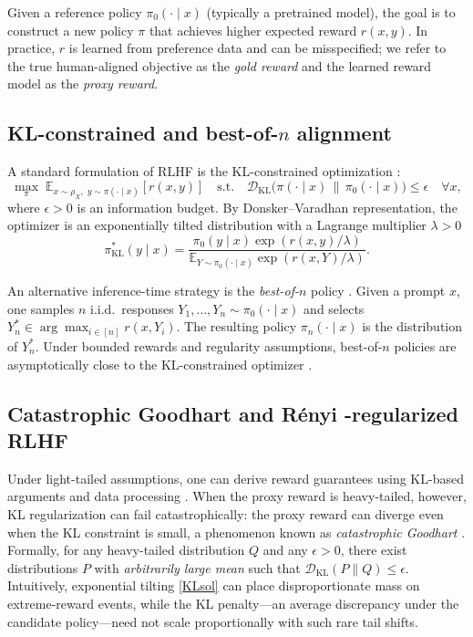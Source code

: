 \documentclass[11pt]{article}
\providecommand{\DD}{\mathcal{D}}
\providecommand{\Renyi}{R\'enyi }
\begin{document}
Given a reference policy $\pi_0(\cdot\mid x)$ (typically a pretrained model),
the goal is to construct a new policy $\pi$ that achieves higher expected reward
$r(x,y)$.  In practice, $r$ is learned from preference data and can be
misspecified; we refer to the true human-aligned objective as the \emph{gold
reward} and the learned reward model as the \emph{proxy reward}.

\subsection{KL-constrained and best-of-\texorpdfstring{$n$}{n} alignment}

A standard formulation of RLHF is the KL-constrained optimization
\citep{ouyang2022training}:
\begin{equation}\label{opt}
\max_{\pi}\;
\mathbb{E}_{x\sim\rho_X,\;y\sim\pi(\cdot\mid x)}[r(x,y)]
\quad\text{s.t.}\quad
\DD_{\mathrm{KL}}\bigl(\pi(\cdot\mid x)\,\|\,\pi_0(\cdot\mid x)\bigr)\le\epsilon
\quad\forall x,
\end{equation}
where $\epsilon>0$ is an information budget.
By Donsker--Varadhan representation, the optimizer is an exponentially tilted distribution \citep{yang2024asymptotics} with a Lagrange multiplier $\lambda>0$
\begin{equation}\label{KLsol}
\pi^{*}_{\mathrm{KL}}(y\mid x)
=\frac{\pi_0(y\mid x)\exp(r(x,y)/\lambda)}
{\mathbb{E}_{Y\sim\pi_0(\cdot\mid x)}\exp(r(x,Y)/\lambda)}.
\end{equation}

An alternative inference-time strategy is the \emph{best-of-$n$} policy
\citep{stiennon2020learning,nakano2021webgpt}.
Given a prompt $x$, one samples $n$ i.i.d.\ responses
$Y_1,\dots,Y_n\sim\pi_0(\cdot\mid x)$ and selects
$Y_n^*\in \arg\max_{i\in [n]} r(x,Y_i)$. The resulting policy
$\pi_n(\cdot\mid x)$ is the distribution of $Y_n^*$.
Under bounded rewards and regularity assumptions, best-of-$n$ policies are
asymptotically close to the KL-constrained optimizer
\citep{mroueh2025information,yang2024asymptotics}.

\subsection{Catastrophic Goodhart and \Renyi-regularized RLHF}

Under light-tailed assumptions, one can derive reward guarantees using KL-based
arguments and data processing \citep{mroueh2025information}.
When the proxy reward is heavy-tailed, however, KL regularization can fail
catastrophically: the proxy reward can diverge even when the KL constraint is
small, a phenomenon known as \emph{catastrophic Goodhart}
\citep{kwa2024catastrophic}.
Formally, for any heavy-tailed distribution $Q$ and any $\epsilon>0$, there exist
distributions $P$ with \emph{arbitrarily large mean} such that
$\DD_{\mathrm{KL}}(P\|Q)\le\epsilon$.
Intuitively, exponential tilting \eqref{KLsol} can place disproportionate mass
on extreme-reward events, while the KL penalty---an average discrepancy under the
candidate policy---need not scale proportionally with such rare tail shifts.
\end{document}

